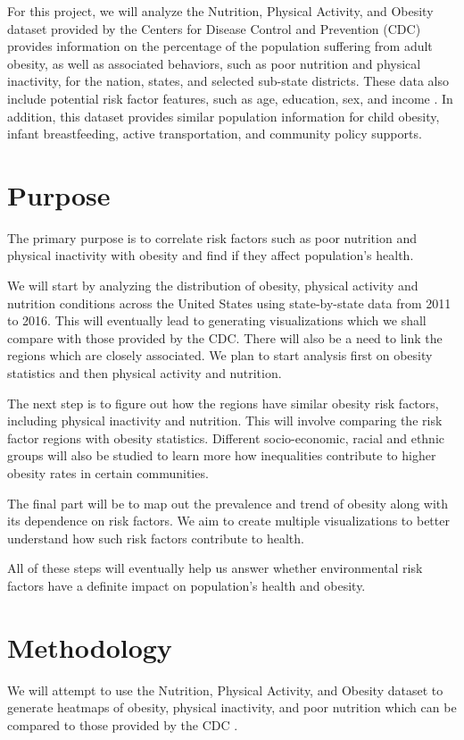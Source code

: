 \documentclass{article}
\begin{document}
For this project, we will analyze the Nutrition, Physical Activity, and Obesity dataset provided by the Centers for Disease Control and Prevention (CDC) provides information on the percentage of the population suffering from adult obesity, as well as associated behaviors, such as poor nutrition and physical inactivity, for the nation, states, and selected sub-state districts. These data also include potential risk factor features, such as age, education, sex, and income \cite{nutphysactobesitydata}.
In addition, this dataset provides similar population information for child obesity, infant breastfeeding, active transportation, and community policy supports.

\section{Purpose}
\label{purpose}
The primary purpose is to correlate risk factors such as poor nutrition and physical inactivity with obesity and find if they affect population's health.

We will start by analyzing the distribution of obesity, physical activity and nutrition conditions across the United States using state-by-state data from 2011 to 2016. This will eventually lead to generating visualizations which we shall compare with those provided by the CDC. There will also be a need to link the regions which are closely associated. We plan to start analysis first on obesity statistics and then physical activity and nutrition.

The next step is to figure out how the regions have similar obesity risk factors, including physical inactivity and nutrition. This will involve comparing the risk factor regions with obesity statistics. Different socio-economic, racial and ethnic groups will also be studied to learn more how inequalities contribute to higher obesity rates in certain communities.

The final part will be to map out the prevalence and trend of obesity along with its dependence on risk factors. We aim to create multiple visualizations to better understand how such risk factors contribute to health.

All of these steps will eventually help us answer whether environmental risk factors have a definite impact on population's health and obesity.

\section{Methodology}
\label{methodology}
We will attempt to use the Nutrition, Physical Activity, and Obesity dataset to generate heatmaps of obesity, physical inactivity, and poor nutrition which can be compared to those provided by the CDC \cite{adultobesitymaps}. 
\end{document}
